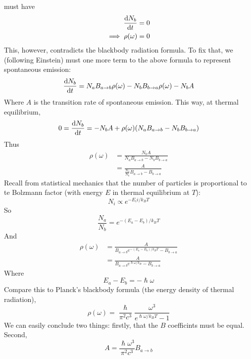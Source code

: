 \documentclass[a4paper]{article}
\begin{document}
must have
\begin{align*}
	\frac{\mathrm{d} N_b}{\mathrm{d} t} &= 0\\
	\implies \rho(\omega) &= 0
\end{align*}
This, however, contradicts the blackbody radiation formula. To fix that, we
(following Einstein) must one more term to the above formula to represent
spontaneous emission:
\[
	\frac{\mathrm{d} N_b}{\mathrm{d} t} = N_aB_{a\to b}\rho(\omega) - N_bB_{b\to a}\rho(\omega) -
		N_b A
\]
Where $A$ is the transition rate of spontaneous emission. This way, at thermal
equilibrium,
\[
	0 = \frac{\mathrm{d} N_b}{\mathrm{d} t} = -N_bA + \rho(\omega) (N_aB_{a\to b} - N_bB_{b\to a})
\]
Thus
\begin{align*}
	\rho(\omega) &= \frac{N_bA}{N_aB_{a\to b} - N_bB_{b\to a}}\\
		     &= \frac{A}{\frac{N_a}{N_b}B_{a\to b}-B_{b\to a}}
\end{align*}
Recall from statistical mechanics that the number of particles is proportional
to te Bolzmann factor (with energy $E$ in thermal equilibrium at $T$):
\[
	N_i \propto e^{-E_ii/k_BT}
\]
So
\[
	\frac{N_a}{N_b} = e^{-(E_a-E_b)/k_BT}
\]
And
\begin{align*}
	\rho(\omega) &= \frac{A}{B_{a\to b}e^{-(E_a-E_b)/k_BT}-B_{b\to a}}\\
		     &= \frac{A}{B_{a\to b}e^{\hslash\omega/k_B}-B_{b\to a}}
\end{align*}
Where
\[
	E_a-E_b = -\hslash\omega
\]
Compare this to Planck's blackbody formula (the energy density of thermal
radiation),
\[
	\rho(\omega) = \frac{\hslash}{\pi^2c^3}
		\frac{\omega^3}{e^{\hslash\omega/k_BT}-1}
\]
We can easily conclude two things: firstly, that the $B$ coefficints must be
equal. Second,
\[
	A= \frac{\hslash\omega^3}{\pi^2c^3}B_{a\to b}
\]
\end{document}
